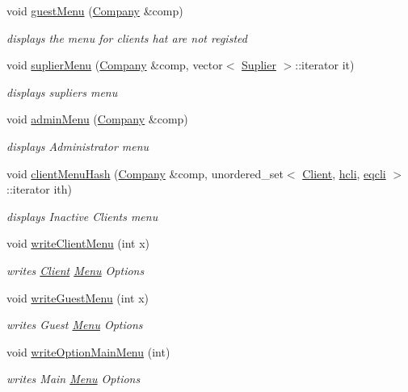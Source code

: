 \begin{DoxyCompactItemize}
void \hyperlink{class_menu_a3975fa8a4000220fed81af46ccd24da4}{guest\+Menu} (\hyperlink{class_company}{Company} \&comp)
\begin{DoxyCompactList}\small\item\em displays the menu for clients hat are not registed \end{DoxyCompactList}\item 
void \hyperlink{class_menu_a5b816b93adda2ccae15ee205855a139c}{suplier\+Menu} (\hyperlink{class_company}{Company} \&comp, vector$<$ \hyperlink{class_suplier}{Suplier} $>$\+::iterator it)
\begin{DoxyCompactList}\small\item\em displays supliers menu \end{DoxyCompactList}\item 
void \hyperlink{class_menu_a8df6166e3d285587a8a0f827adac2963}{admin\+Menu} (\hyperlink{class_company}{Company} \&comp)
\begin{DoxyCompactList}\small\item\em displays Administrator menu \end{DoxyCompactList}\item 
void \hyperlink{class_menu_aa69e8ebe9ec9d077de45860e46a5fcbc}{client\+Menu\+Hash} (\hyperlink{class_company}{Company} \&comp, unordered\+\_\+set$<$ \hyperlink{class_client}{Client}, \hyperlink{structhcli}{hcli}, \hyperlink{structeqcli}{eqcli} $>$\+::iterator ith)
\begin{DoxyCompactList}\small\item\em displays Inactive Clients menu \end{DoxyCompactList}\item 
void \hyperlink{class_menu_ad2ab81c4a817ce989669873977dc59c2}{write\+Client\+Menu} (int x)
\begin{DoxyCompactList}\small\item\em writes \hyperlink{class_client}{Client} \hyperlink{class_menu}{Menu} Options \end{DoxyCompactList}\item 
void \hyperlink{class_menu_a807767f25b48bb6007fd437ce20ca9ee}{write\+Guest\+Menu} (int x)
\begin{DoxyCompactList}\small\item\em writes Guest \hyperlink{class_menu}{Menu} Options \end{DoxyCompactList}\item 
void \hyperlink{class_menu_a27065457645afe85598070c8d009b439}{write\+Option\+Main\+Menu} (int)
\begin{DoxyCompactList}\small\item\em writes Main \hyperlink{class_menu}{Menu} Options \end{DoxyCompactList}\item 

\end{DoxyCompactItemize}

